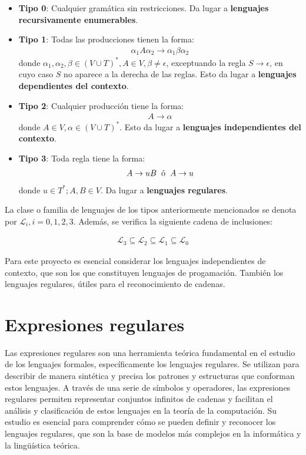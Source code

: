 \begin{itemize}
    \item \textbf{Tipo 0}: Cualquier gramática sin restricciones. Da lugar a \textbf{lenguajes recursivamente enumerables}.
    \item \textbf{Tipo 1}: Todas las producciones tienen la forma:
    \begin{align*}
        \alpha_1 A \alpha_2 \rightarrow \alpha_1 \beta \alpha_2
    \end{align*}
    donde $\alpha_1,\alpha_2,\beta \in (V \cup T)^*, A \in V, \beta \neq \epsilon$, exceptuando la regla $S \rightarrow \epsilon$, en cuyo caso $S$ no aparece a la derecha de las reglas. Esto da lugar a \textbf{lenguajes dependientes del contexto}.
    \item \textbf{Tipo 2}: Cualquier producción tiene la forma:
    \begin{align*}
        A \rightarrow \alpha
    \end{align*}
    donde $A \in V, \alpha \in (V \cup T)^*$. Esto da lugar a \textbf{lenguajes independientes del contexto}.
    \item \textbf{Tipo 3}: Toda regla tiene la forma:
    \begin{align*}
        A \rightarrow uB \hspace{0.2cm} \text{ó} \hspace{0.2cm} A \rightarrow u
    \end{align*}
    donde $u \in T^*; A,B \in V$. Da lugar a \textbf{lenguajes regulares}.
\end{itemize}

La clase o familia de lenguajes de los tipos anteriormente mencionados se denota por $\mathcal{L}_i, i = 0,1,2,3$. Además, se verifica la siguiente cadena de inclusiones:

\begin{align*}
    \mathcal{L}_3 \subseteq \mathcal{L}_2 \subseteq \mathcal{L}_1 \subseteq \mathcal{L}_0
\end{align*}

Para este proyecto es esencial considerar los lenguajes independientes de contexto, que son los que constituyen lenguajes de progamación. También los lenguajes regulares, útiles para el reconocimiento de cadenas.

\section{Expresiones regulares}\label{section:expr}
Las expresiones regulares son una herramienta teórica fundamental en el estudio de los lenguajes formales, específicamente los lenguajes regulares. Se utilizan para describir de manera sintética y precisa los patrones y estructuras que conforman estos lenguajes. A través de una serie de símbolos y operadores, las expresiones regulares permiten representar conjuntos infinitos de cadenas y facilitan el análisis y clasificación de estos lenguajes en la teoría de la computación. Su estudio es esencial para comprender cómo se pueden definir y reconocer los lenguajes regulares, que son la base de modelos más complejos en la informática y la lingüística teórica.

